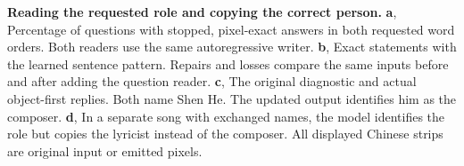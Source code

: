 \textbf{Reading the requested role and copying the correct person.}
\textbf{a}, Percentage of questions with stopped, pixel-exact answers in both requested word orders. Both readers use the same autoregressive writer.
\textbf{b}, Exact statements with the learned sentence pattern. Repairs and losses compare the same inputs before and after adding the question reader.
\textbf{c}, The original diagnostic and actual object-first replies. Both name Shen He. The updated output identifies him as the composer.
\textbf{d}, In a separate song with exchanged names, the model identifies the role but copies the lyricist instead of the composer. All displayed Chinese strips are original input or emitted pixels.
